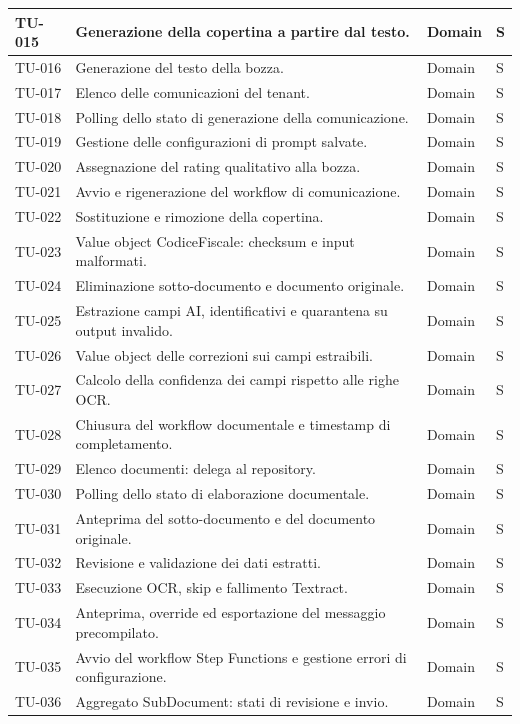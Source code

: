 \documentclass[a4paper,12pt]{article}
\begin{document}
\begin{longtable}{|p{2.0cm}|p{8.8cm}|p{2.2cm}|p{1.5cm}|}
    \hline
    TU-015 & Generazione della copertina a partire dal testo. & Domain & S \\
    \hline
    TU-016 & Generazione del testo della bozza. & Domain & S \\
    \hline
    TU-017 & Elenco delle comunicazioni del tenant. & Domain & S \\
    \hline
    TU-018 & Polling dello stato di generazione della comunicazione. & Domain & S \\
    \hline
    TU-019 & Gestione delle configurazioni di prompt salvate. & Domain & S \\
    \hline
    TU-020 & Assegnazione del rating qualitativo alla bozza. & Domain & S \\
    \hline
    TU-021 & Avvio e rigenerazione del workflow di comunicazione. & Domain & S \\
    \hline
    TU-022 & Sostituzione e rimozione della copertina. & Domain & S \\
    \hline
    TU-023 & Value object CodiceFiscale: checksum e input malformati. & Domain & S \\
    \hline
    TU-024 & Eliminazione sotto-documento e documento originale. & Domain & S \\
    \hline
    TU-025 & Estrazione campi AI, identificativi e quarantena su output invalido. & Domain & S \\
    \hline
    TU-026 & Value object delle correzioni sui campi estraibili. & Domain & S \\
    \hline
    TU-027 & Calcolo della confidenza dei campi rispetto alle righe OCR. & Domain & S \\
    \hline
    TU-028 & Chiusura del workflow documentale e timestamp di completamento. & Domain & S \\
    \hline
    TU-029 & Elenco documenti: delega al repository. & Domain & S \\
    \hline
    TU-030 & Polling dello stato di elaborazione documentale. & Domain & S \\
    \hline
    TU-031 & Anteprima del sotto-documento e del documento originale. & Domain & S \\
    \hline
    TU-032 & Revisione e validazione dei dati estratti. & Domain & S \\
    \hline
    TU-033 & Esecuzione OCR, skip e fallimento Textract. & Domain & S \\
    \hline
    TU-034 & Anteprima, override ed esportazione del messaggio precompilato. & Domain & S \\
    \hline
    TU-035 & Avvio del workflow Step Functions e gestione errori di configurazione. & Domain & S \\
    \hline
    TU-036 & Aggregato SubDocument: stati di revisione e invio. & Domain & S \\
    \hline
\end{longtable}
\end{document}
